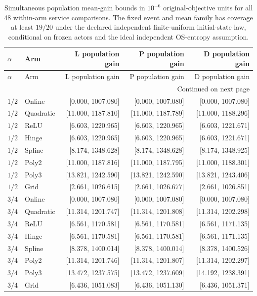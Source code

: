 \begingroup
\scriptsize
\setlength{\tabcolsep}{3pt}
\begin{longtable}{llrrr}
\caption{Simultaneous population mean-gain bounds in $10^{-6}$ original-objective units for all 48 within-arm service comparisons. The fixed event and mean family has coverage at least $19/20$ under the declared independent finite-uniform initial-state law, conditional on frozen actors and the ideal independent OS-entropy assumption.}\label{tab:population120}\\
\toprule
$\alpha$ & Arm & L population gain & P population gain & D population gain \\ \midrule
\endfirsthead
\toprule
$\alpha$ & Arm & L population gain & P population gain & D population gain \\ \midrule
\endhead
\midrule\multicolumn{5}{r}{Continued on next page}\\\endfoot
\bottomrule\endlastfoot
$1/2$ & Online & [0.000, 1007.080] & [0.000, 1007.080] & [0.000, 1007.080] \\
$1/2$ & Quadratic & [11.000, 1187.810] & [11.000, 1187.789] & [11.000, 1188.296] \\
$1/2$ & ReLU & [6.603, 1220.965] & [6.603, 1220.965] & [6.603, 1221.671] \\
$1/2$ & Hinge & [6.603, 1220.965] & [6.603, 1220.965] & [6.603, 1221.671] \\
$1/2$ & Spline & [8.174, 1348.628] & [8.174, 1348.628] & [8.174, 1348.925] \\
$1/2$ & Poly2 & [11.000, 1187.816] & [11.000, 1187.795] & [11.000, 1188.301] \\
$1/2$ & Poly3 & [13.821, 1242.590] & [13.821, 1242.590] & [13.821, 1243.406] \\
$1/2$ & Grid & [2.661, 1026.615] & [2.661, 1026.677] & [2.661, 1026.851] \\
$3/4$ & Online & [0.000, 1007.080] & [0.000, 1007.080] & [0.000, 1007.080] \\
$3/4$ & Quadratic & [11.314, 1201.747] & [11.314, 1201.808] & [11.314, 1202.298] \\
$3/4$ & ReLU & [6.561, 1170.581] & [6.561, 1170.581] & [6.561, 1171.135] \\
$3/4$ & Hinge & [6.561, 1170.581] & [6.561, 1170.581] & [6.561, 1171.135] \\
$3/4$ & Spline & [8.378, 1400.014] & [8.378, 1400.014] & [8.378, 1400.526] \\
$3/4$ & Poly2 & [11.314, 1201.746] & [11.314, 1201.807] & [11.314, 1202.297] \\
$3/4$ & Poly3 & [13.472, 1237.575] & [13.472, 1237.609] & [14.192, 1238.391] \\
$3/4$ & Grid & [6.436, 1051.083] & [6.436, 1051.130] & [6.436, 1051.371] \\
\end{longtable}
\endgroup


